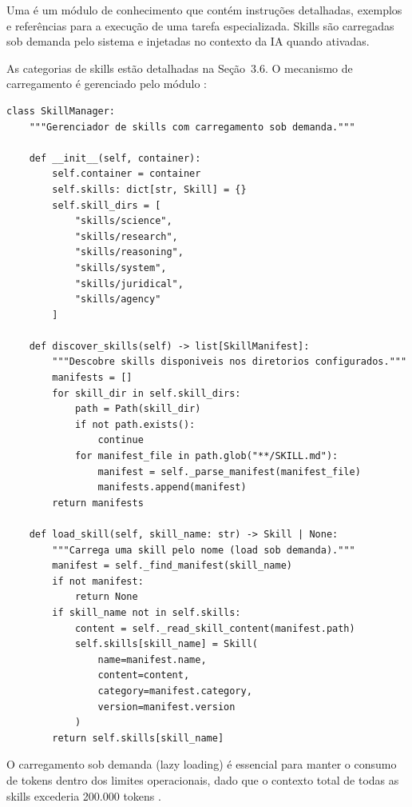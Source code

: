 \begin{definicao}[Skill]
Uma  é um módulo de conhecimento que contém instruções
detalhadas, exemplos e referências para a execução de uma tarefa
especializada. Skills são carregadas sob demanda pelo sistema e
injetadas no contexto da IA quando ativadas.
\end{definicao}

As categorias de skills estão detalhadas na Seção~3.6. O mecanismo de
carregamento é gerenciado pelo módulo :

\begin{lstlisting}[style=pythonstyle, caption={Mecanismo de carregamento de skills},
                   label={lst:skill-load}]
class SkillManager:
    """Gerenciador de skills com carregamento sob demanda."""

    def __init__(self, container):
        self.container = container
        self.skills: dict[str, Skill] = {}
        self.skill_dirs = [
            "skills/science",
            "skills/research",
            "skills/reasoning",
            "skills/system",
            "skills/juridical",
            "skills/agency"
        ]

    def discover_skills(self) -> list[SkillManifest]:
        """Descobre skills disponiveis nos diretorios configurados."""
        manifests = []
        for skill_dir in self.skill_dirs:
            path = Path(skill_dir)
            if not path.exists():
                continue
            for manifest_file in path.glob("**/SKILL.md"):
                manifest = self._parse_manifest(manifest_file)
                manifests.append(manifest)
        return manifests

    def load_skill(self, skill_name: str) -> Skill | None:
        """Carrega uma skill pelo nome (load sob demanda)."""
        manifest = self._find_manifest(skill_name)
        if not manifest:
            return None
        if skill_name not in self.skills:
            content = self._read_skill_content(manifest.path)
            self.skills[skill_name] = Skill(
                name=manifest.name,
                content=content,
                category=manifest.category,
                version=manifest.version
            )
        return self.skills[skill_name]
\end{lstlisting}

O carregamento sob demanda (lazy loading) é essencial para manter o
consumo de tokens dentro dos limites operacionais, dado que o contexto
total de todas as skills excederia 200.000 tokens
\cite{achiam2023gpt4, brown2020language}.

